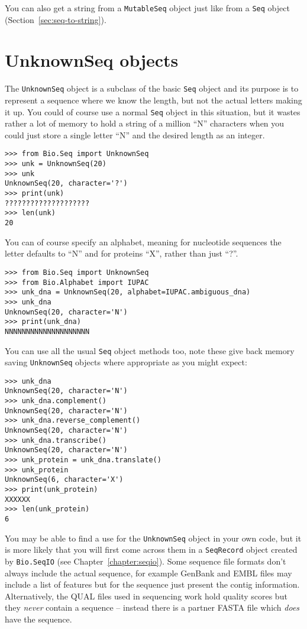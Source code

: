 You can also get a string from a \verb|MutableSeq| object just like from a \verb|Seq| object (Section~\ref{sec:seq-to-string}).

\section{UnknownSeq objects}
The \verb|UnknownSeq| object is a subclass of the basic \verb|Seq| object
and its purpose is to represent a
sequence where we know the length, but not the actual letters making it up.
You could of course use a normal \verb|Seq| object in this situation, but it wastes
rather a lot of memory to hold a string of a million ``N'' characters when you could
just store a single letter ``N'' and the desired length as an integer.

\begin{verbatim}
>>> from Bio.Seq import UnknownSeq
>>> unk = UnknownSeq(20)
>>> unk
UnknownSeq(20, character='?')
>>> print(unk)
????????????????????
>>> len(unk)
20
\end{verbatim}

You can of course specify an alphabet, meaning for nucleotide sequences
the letter defaults to ``N'' and for proteins ``X'', rather than just ``?''.

\begin{verbatim}
>>> from Bio.Seq import UnknownSeq
>>> from Bio.Alphabet import IUPAC
>>> unk_dna = UnknownSeq(20, alphabet=IUPAC.ambiguous_dna)
>>> unk_dna
UnknownSeq(20, character='N')
>>> print(unk_dna)
NNNNNNNNNNNNNNNNNNNN
\end{verbatim}

You can use all the usual \verb|Seq| object methods too, note these give back
memory saving \verb|UnknownSeq| objects where appropriate as you might expect:

\begin{verbatim}
>>> unk_dna
UnknownSeq(20, character='N')
>>> unk_dna.complement()
UnknownSeq(20, character='N')
>>> unk_dna.reverse_complement()
UnknownSeq(20, character='N')
>>> unk_dna.transcribe()
UnknownSeq(20, character='N')
>>> unk_protein = unk_dna.translate()
>>> unk_protein
UnknownSeq(6, character='X')
>>> print(unk_protein)
XXXXXX
>>> len(unk_protein)
6
\end{verbatim}

You may be able to find a use for the \verb|UnknownSeq| object in your own
code, but it is more likely that you will first come across them in a
\verb|SeqRecord| object created by \verb|Bio.SeqIO|
(see Chapter~\ref{chapter:seqio}).
Some sequence file formats don't always include the actual sequence, for
example GenBank and EMBL files may include a list of features but for the
sequence just present the contig information.  Alternatively, the QUAL files
used in sequencing work hold quality scores but they \emph{never} contain a
sequence -- instead there is a partner FASTA file which \emph{does} have the
sequence.


